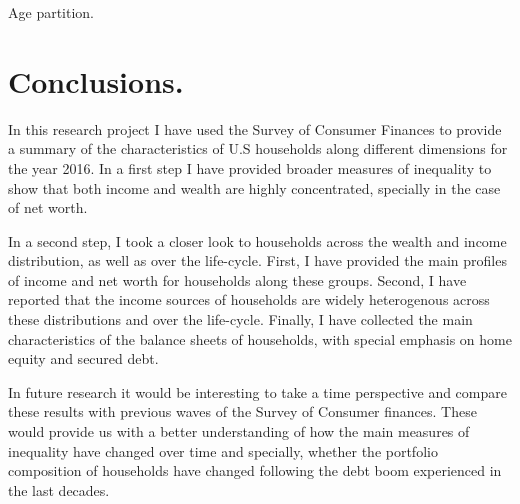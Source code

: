 \documentclass[11pt, a4paper, leqno]{article}
\begin{document}
\begin{table}[h]
    \caption{Age partition.}
    \resizebox{\textwidth}{!}{}
    \label{tab:agepartition}
\end{table}


\section{Conclusions.}
 
 In this research project I have used the Survey of Consumer Finances to provide a summary of the characteristics of U.S households along different dimensions for the year 2016. In a first step I have provided broader measures of inequality to show that both income and wealth are highly concentrated, specially in the case of net worth. 

 In a second step, I took a closer look to households across the wealth and income distribution, as well as over the life-cycle. First, I have provided the main profiles of income and net worth for households along these groups. Second, I have reported that the income sources of households are widely heterogenous across these distributions and over the life-cycle. Finally, I have collected the main characteristics of the balance sheets of households, with special emphasis on home equity and secured debt.

 In future research it would be interesting to take a time perspective and compare these results with previous waves of the Survey of Consumer finances. These would provide us with a better understanding of how the main measures of inequality have changed over time and specially, whether the portfolio composition of households have changed following the debt boom experienced in the last decades. 










\end{document}
